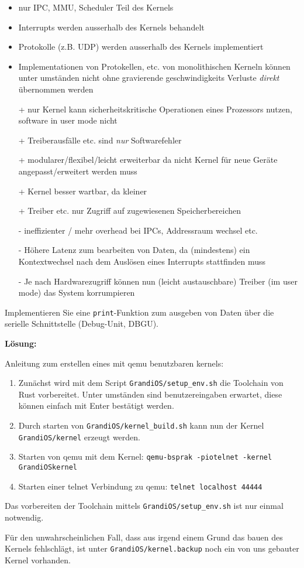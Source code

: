 \begin{description}
\begin{itemize}
  \item nur IPC, MMU, Scheduler Teil des Kernels
  \item Interrupts werden ausserhalb des Kernels behandelt
  \item Protokolle (z.B. UDP) werden ausserhalb des Kernels implementiert
  \item Implementationen von Protokellen, etc. von monolithischen Kerneln können unter umständen nicht ohne gravierende geschwindigkeits Verluste \emph{direkt} übernommen werden
  \item[+] nur Kernel kann sicherheitskritische Operationen eines Prozessors nutzen, software in user mode nicht
  \item[+] Treiberausfälle etc. sind \emph{nur} Softwarefehler
  \item[+] modularer/flexibel/leicht erweiterbar da nicht Kernel für neue Geräte angepasst/erweitert werden muss
  \item[+] Kernel besser wartbar, da kleiner
  \item[+] Treiber etc. nur Zugriff auf zugewiesenen Speicherbereichen
  \item[-] ineffizienter / mehr overhead bei IPCs, Addressraum wechsel etc.
  \item[-] Höhere Latenz zum bearbeiten von Daten, da (mindestens) ein Kontextwechsel nach dem Auslösen eines Interrupts stattfinden muss
  \item[-] Je nach Hardwarezugriff können nun (leicht austauschbare) Treiber (im user mode) das System korrumpieren
\end{itemize}



Implementieren Sie eine \texttt{print}-Funktion zum ausgeben von Daten über die serielle Schnittstelle (Debug-Unit, DBGU).

\textbf{Lösung:}

Anleitung zum erstellen eines mit qemu benutzbaren kernels:
\begin{enumerate}
	\item Zunächst wird mit dem Script \texttt{GrandiOS/setup\_env.sh} die Toolchain von Rust vorbereitet. Unter umständen sind benutzereingaben erwartet, diese können einfach mit Enter bestätigt werden.
	\item Durch starten von \texttt{GrandiOS/kernel\_build.sh} kann nun der Kernel \texttt{GrandiOS/kernel} erzeugt werden.
	\item Starten von qemu mit dem Kernel: \texttt{qemu-bsprak -piotelnet -kernel GrandiOS\/kernel}
	\item Starten einer telnet Verbindung zu qemu: \texttt{telnet localhost 44444}
\end{enumerate}
Das vorbereiten der Toolchain mittels \texttt{GrandiOS/setup\_env.sh} ist nur einmal notwendig.

Für den unwahrscheinlichen Fall, dass aus irgend einem Grund das bauen des Kernels fehlschlägt, ist unter \texttt{GrandiOS/kernel.backup} noch ein von uns gebauter Kernel vorhanden.

\end{description}

